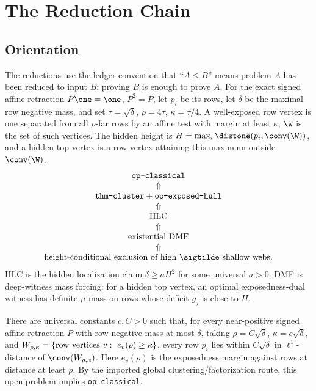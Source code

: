 \section{The Reduction Chain}

\subsection{Orientation}
The reductions use the ledger convention that ``\(A\leq B\)'' means problem
\(A\) has been reduced to input \(B\): proving \(B\) is enough to prove \(A\).
For the exact signed affine retraction \(P\one=\one\), \(P^2=P\), let \(p_i\)
be its rows, let \(\delta\) be the maximal row negative mass, and set
\(\tau=\sqrt\delta\), \(\rho=4\tau\), \(\kappa=\tau/4\).  A well-exposed row
vertex is one separated from all \(\rho\)-far rows by an affine test with
margin at least \(\kappa\); \(\W\) is the set of such vertices.  The hidden
height is \(H=\max_i\distone(p_i,\conv(\W))\), and a hidden top vertex is a
row vertex attaining this maximum outside \(\conv(\W)\).
\[
\begin{array}{c}
\text{\texttt{op-classical}}\\
\Uparrow\\
\text{\texttt{thm-cluster}}+\text{\texttt{op-exposed-hull}}\\
\Uparrow\\
\text{HLC}\\
\Uparrow\\
\text{existential DMF}\\
\Uparrow\\
\text{height-conditional exclusion of high } \sigtilde \text{ shallow webs.}
\end{array}
\]
HLC is the hidden localization claim \(\delta\geq aH^2\) for some universal
\(a>0\).  DMF is deep-witness mass forcing: for a hidden top vertex, an
optimal exposedness-dual witness has definite \(\mu\)-mass on rows whose
deficit \(g_j\) is close to \(H\).

\begin{openproblem}
\openbadge
\label{op:exposed-hull-formal}
There are universal constants \(c,C>0\) such that, for every near-positive
signed affine retraction \(P\) with row negative mass at most \(\delta\),
taking \(\rho=C\sqrt{\delta}\), \(\kappa=c\sqrt{\delta}\), and
\(W_{\rho,\kappa}=\{\hbox{row vertices }v:\ e_v(\rho)\geq\kappa\}\), every
row \(p_i\) lies within \(C\sqrt{\delta}\) in \(\ell^1\)-distance of
\(\conv(W_{\rho,\kappa})\).  Here \(e_v(\rho)\) is the exposedness margin
against rows at distance at least \(\rho\).  By the imported global
clustering/factorization route, this open problem implies \texttt{op-classical}.
\end{openproblem}

